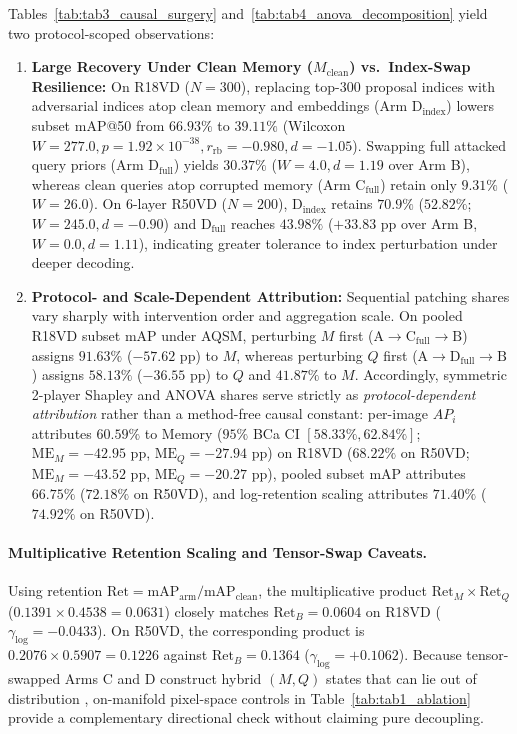 \documentclass[preprint,10pt]{elsarticle}
\begin{document}
Tables~\ref{tab:tab3_causal_surgery} and~\ref{tab:tab4_anova_decomposition} yield two protocol-scoped observations:
\begin{enumerate}
    \item \textbf{Large Recovery Under Clean Memory ($M_{\mathrm{clean}}$) vs.\ Index-Swap Resilience:} On R18VD ($N = 300$), replacing top-300 proposal indices with adversarial indices atop clean memory and embeddings ($\text{Arm }\text{D}_{\text{index}}$) lowers subset mAP@50 from $66.93\%$ to $39.11\%$ (Wilcoxon $W = 277.0, p = 1.92 \times 10^{-38}, r_{\mathrm{rb}} = -0.980, d = -1.05$). Swapping full attacked query priors ($\text{Arm }\text{D}_{\text{full}}$) yields $30.37\%$ ($W = 4.0, d = 1.19$ over Arm B), whereas clean queries atop corrupted memory ($\text{Arm }\text{C}_{\text{full}}$) retain only $9.31\%$ ($W = 26.0$). On 6-layer R50VD ($N = 200$), $\text{D}_{\text{index}}$ retains $70.9\%$ ($52.82\%$; $W = 245.0, d = -0.90$) and $\text{D}_{\text{full}}$ reaches $43.98\%$ ($+33.83$ pp over Arm B, $W = 0.0, d = 1.11$), indicating greater tolerance to index perturbation under deeper decoding.
    \item \textbf{Protocol- and Scale-Dependent Attribution:} Sequential patching shares vary sharply with intervention order and aggregation scale. On pooled R18VD subset mAP under AQSM, perturbing $M$ first ($\text{A} \to \text{C}_{\text{full}} \to \text{B}$) assigns $91.63\%$ ($-57.62$ pp) to $M$, whereas perturbing $Q$ first ($\text{A} \to \text{D}_{\text{full}} \to \text{B}$) assigns $58.13\%$ ($-36.55$ pp) to $Q$ and $41.87\%$ to $M$. Accordingly, symmetric 2-player Shapley and ANOVA shares serve strictly as \textit{protocol-dependent attribution} rather than a method-free causal constant: per-image $AP_i$ attributes $60.59\%$ to Memory ($95\%$ BCa CI $[58.33\%, 62.84\%]$; $\text{ME}_M = -42.95$ pp, $\text{ME}_Q = -27.94$ pp) on R18VD ($68.22\%$ on R50VD; $\text{ME}_M = -43.52$ pp, $\text{ME}_Q = -20.27$ pp), pooled subset mAP attributes $66.75\%$ ($72.18\%$ on R50VD), and log-retention scaling attributes $71.40\%$ ($74.92\%$ on R50VD).
\end{enumerate}

\paragraph{Multiplicative Retention Scaling and Tensor-Swap Caveats.}
Using retention $\text{Ret} = \text{mAP}_{\text{arm}} / \text{mAP}_{\text{clean}}$, the multiplicative product $\text{Ret}_M \times \text{Ret}_Q$ ($0.1391 \times 0.4538 = 0.0631$) closely matches $\text{Ret}_B = 0.0604$ on R18VD ($\gamma_{\mathrm{log}} = -0.0433$). On R50VD, the corresponding product is $0.2076 \times 0.5907 = 0.1226$ against $\text{Ret}_B = 0.1364$ ($\gamma_{\mathrm{log}} = +0.1062$). Because tensor-swapped Arms C and D construct hybrid $(M, Q)$ states that can lie out of distribution \citep{pearl2001direct, vig2020causal, meng2022locating}, on-manifold pixel-space controls in Table~\ref{tab:tab1_ablation} provide a complementary directional check without claiming pure decoupling.
\end{document}
